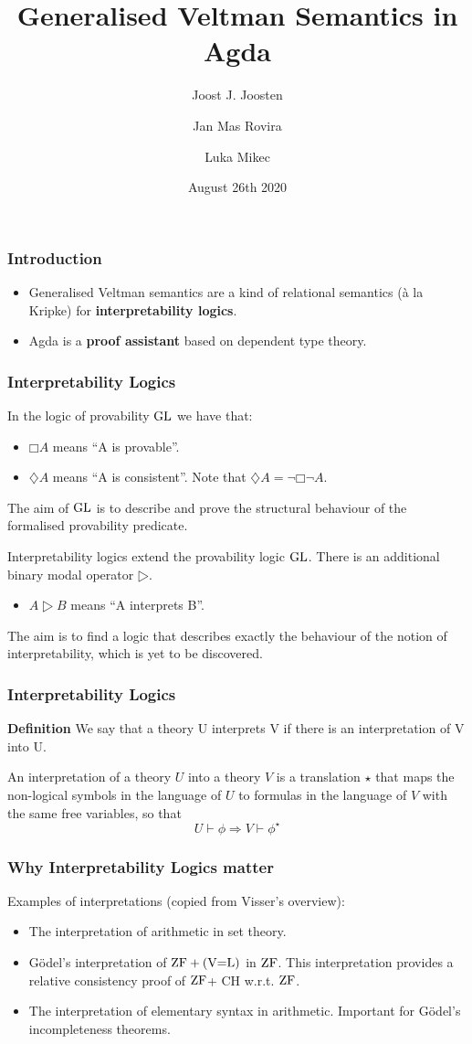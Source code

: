 \documentclass{beamer}
\title{Generalised Veltman Semantics in Agda}
\author{Joost J. Joosten\inst{1} \and Jan Mas Rovira\inst{1}\and Luka Mikec\inst{2}}
\institute[shortinst]{\inst{1} University of Barcelona \and %
  \inst{2} University of Zagreb}
\date{August 26th 2020}
\newcommand{\gl}{\ensuremath{\textup{GL}}\xspace}
\newcommand{\zf}{\ensuremath{\textup{ZF}}\xspace}
\newcommand{\veql}{\ensuremath{\textup{(V=L)}}\xspace}
\begin{document}
\frame{\titlepage}

\begin{frame}
  \frametitle{Introduction}
  \begin{itemize}
  \item Generalised Veltman semantics are a kind of relational semantics (à la
    Kripke) for \textbf{interpretability logics}. \break \pause
    \item Agda is a \textbf{proof assistant} based on dependent type theory.
  \end{itemize}
\end{frame}

\begin{frame}
  \frametitle{Interpretability Logics}
  In the logic of provability \gl we have that:
  \begin{itemize}
    \item $□A$ means ``A is provable''.
    \item $♢A$ means ``A is consistent''. Note that $♢A=¬□¬A$.
  \end{itemize}
  The aim of \gl is to describe and prove the structural behaviour of the
  formalised provability predicate.

  \pause \vspace{0.5cm}

  Interpretability logics extend the provability logic \gl. There is an
  additional binary modal operator $▷$.
  \begin{itemize}
  \item $A▷B$ means ``A interprets B''.
  \end{itemize}
  The aim is to find a logic that describes exactly the behaviour of the notion
  of interpretability, which is yet to be discovered.
\end{frame}

\begin{frame}
  \frametitle{Interpretability Logics}
  \textbf{Definition} We say that a theory U interprets V if there is an
  interpretation of V into U.

  An interpretation of a theory $U$ into a theory $V$ is a translation $⋆$ that
  maps the non-logical symbols in the language of $U$ to formulas in the
  language of $V$ with the same free variables, so that
  \[U⊢ϕ⇒ V⊢ϕ^⋆\]
\end{frame}

\begin{frame}
  \frametitle{Why Interpretability Logics matter}
  Examples of interpretations (copied from Visser's overview):
  \vspace{0.4cm}
  \begin{itemize}
  \item The interpretation of arithmetic in set theory.
    \pause
  \item Gödel's interpretation of $\zf+\veql$ in \zf. This interpretation
    provides a relative consistency proof of \zf + CH w.r.t. \zf.
    \pause
  \item The interpretation of elementary syntax in arithmetic. Important for
    Gödel's incompleteness theorems.
  \end{itemize}

\end{frame}
\end{document}
